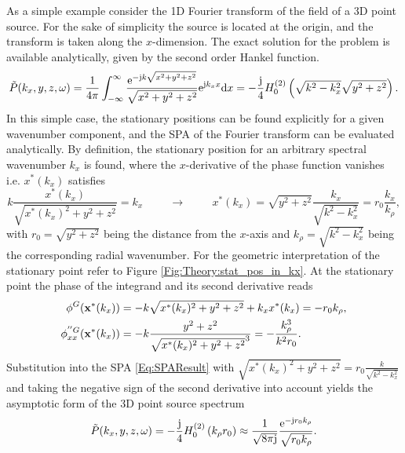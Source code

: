 As a simple example consider the 1D Fourier transform of the field of a 3D point source.
For the sake of simplicity the source is located at the origin, and the transform is taken along the $x$-dimension.
The exact solution for the problem is available analytically, given by the second order Hankel function.
\begin{equation}
\tilde{P}(k_x,y,z,\omega) = \frac{1}{4\pi} \int_{-\infty}^{\infty} \frac{\mathrm{e}^{-\mathrm{j} k \sqrt{x^2 + y^2 + z^2}}}{\sqrt{x^2 + y^2 + z^2}} \mathrm{e}^{\mathrm{j} k_x x} \mathrm{d} x = 
-\frac{\mathrm{j}}{4} H_0^{(2)}\left( \sqrt{k^2- k_x^2} \sqrt{y^2 + z^2} \right).
\label{Eq:HF_approx:Greens_spectrum_defintion}
\end{equation}
In this simple case, the stationary positions can be found explicitly for a given wavenumber component, and the SPA of the Fourier transform can be evaluated analytically. 
By definition, the stationary position for an arbitrary spectral wavenumber $k_x$ is found, where the $x$-derivative of the phase function vanishes i.e. $x^*(k_x)$ satisfies
\begin{equation}
k \frac{x^*(k_x)}{\sqrt{x^*(k_x)^2 + y^2 + z^2}} = k_x 
\hspace{1cm} \rightarrow \hspace{1cm} 
x^*(k_x) = \sqrt{y^2 + z^2} \frac{k_x}{\sqrt{k^2 - k_x^2}}  = r_0 \frac{k_x}{k_{\rho}},
\label{eq:HF_approx:greens_spectrum_stat_point}
\end{equation}
with $r_0 = \sqrt{y^2+z^2}$ being the distance from the $x$-axis and $k_{\rho} = \sqrt{k^2-k_x^2}$ being the corresponding radial wavenumber.
For the geometric interpretation of the stationary point refer to Figure \ref{Fig:Theory:stat_pos_in_kx}.
At the stationary point the phase of the integrand and its second derivative reads
\begin{align}
\phi^{G}(\mathbf{x}^*(k_x)) &=  -k \sqrt{x^*(k_x)^2 + y^2 + z^2} + k_x x^*(k_x) = -r_0 k_{\rho},\\
\phi^{''G}_{xx}(\mathbf{x}^*(k_x)) &=  -k \frac{y^2+z^2}{\sqrt{ x^*(k_x)^2 +y^2+z^2 }^3} = - \frac{k_{\rho}^3}{k^2 r_0}.
\end{align}
Substitution into the SPA \eqref{Eq:SPAResult} with $\sqrt{x^*(k_x)^2 + y^2 + z^2} = r_0\frac{k}{\sqrt{k^2 - k_x^2}}$ and taking the negative sign of the second derivative into account yields the asymptotic form of the 3D point source spectrum
\begin{equation}
\tilde{P}(k_x,y,z,\omega) = -\frac{\mathrm{j}}{4} H_0^{(2)}\left( k_{\rho} r_0 \right) \approx \frac{1}{\sqrt{8\pi \mathrm{j}}} \frac{\mathrm{e} ^{-\mathrm{j} r_0 k_{\rho}}}{\sqrt{r_0 k_{\rho} }}.
\label{Eq:25D_WFS:3D_Greens_asymp_spectrum}
\end{equation}
